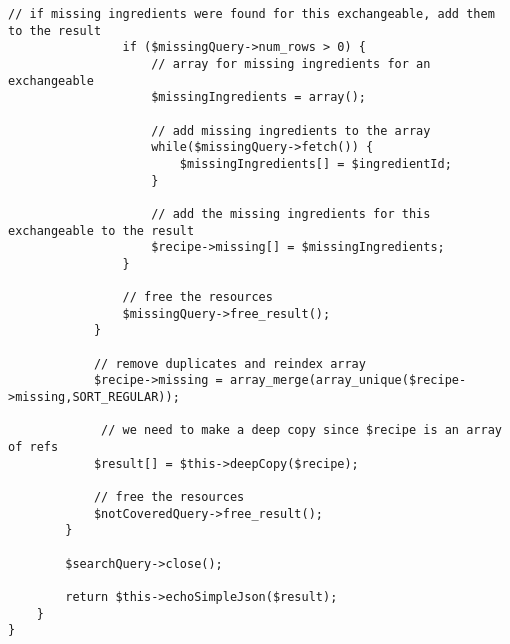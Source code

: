 \begin{lstlisting}[language=phpstyle, caption={Search by ingredients.}]
                // if missing ingredients were found for this exchangeable, add them to the result
                if ($missingQuery->num_rows > 0) {
                    // array for missing ingredients for an exchangeable
            		$missingIngredients = array();

                    // add missing ingredients to the array
            		while($missingQuery->fetch()) {
            			$missingIngredients[] = $ingredientId;
            		}

                    // add the missing ingredients for this exchangeable to the result
            		$recipe->missing[] = $missingIngredients;
                }

                // free the resources
                $missingQuery->free_result();
        	}

        	// remove duplicates and reindex array
        	$recipe->missing = array_merge(array_unique($recipe->missing,SORT_REGULAR));

             // we need to make a deep copy since $recipe is an array of refs
        	$result[] = $this->deepCopy($recipe);

            // free the resources
            $notCoveredQuery->free_result();
        }

        $searchQuery->close();

        return $this->echoSimpleJson($result);
    }
}
\end{lstlisting}